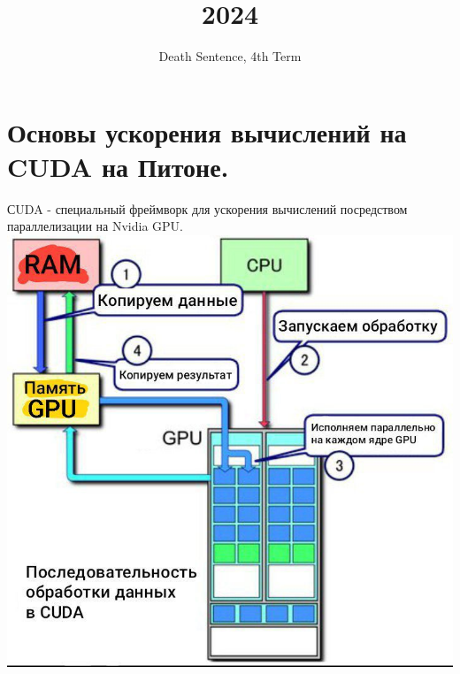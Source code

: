 \documentclass[14pt]{extarticle}
\title{2024}
\author{Death Sentence, 4th Term}
\begin{document}
\maketitle
\tableofcontents

\section{Основы ускорения вычислений на CUDA на Питоне.}
СUDA - специальный фреймворк для ускорения вычислений посредством
параллелизации на Nvidia GPU. \\
\includegraphics[scale=0.5]{CUDA_processing_flow.png}
\newpage
\end{document}
